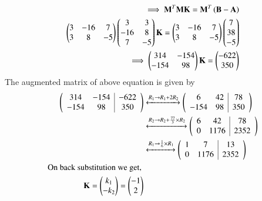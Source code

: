 \documentclass[journal]{IEEEtran}
\begin{document}
\begin{align}
\implies \mathbf{M}^T\mathbf{M}\mathbf{K}=\mathbf{M}^T\left(\mathbf{B}-\mathbf{A}\right)\\
    \begin{pmatrix}
        3 & -16 & 7\\
        3 & 8 & -5
    \end{pmatrix}\begin{pmatrix}
    3 & 3\\
    -16 & 8\\
    7 & -5
        \end{pmatrix}\mathbf{K}=\begin{pmatrix}
        3 & -16 & 7\\
        3 & 8 & -5
    \end{pmatrix}\begin{pmatrix}7\\38\\-5\end{pmatrix}\\
    \implies \begin{pmatrix}
        314 & -154\\
        -154 & 98
    \end{pmatrix}\mathbf{K}=\begin{pmatrix}-622\\350\end{pmatrix}
\end{align}
The augmented matrix of above equation is given by
\begin{align}
    \left(\begin{array}{cc|c}
        314 & -154 & -622 \\
        -154 & 98 & 350 
\end{array}\right) &\xleftrightarrow{R_1 \rightarrow R_1+ 2R_2} \left(\begin{array}{cc|c}
        6 & 42 & 78 \\
        -154 & 98 & 350 
\end{array}\right)\\ &\xleftrightarrow{R_2 \rightarrow R_2+ \frac{77}{3}\times R_2} \left(\begin{array}{cc|c}
        6 & 42 & 78 \\
        0 & 1176 & 2352 
\end{array}\right)\\
&\xleftrightarrow{R_1 \rightarrow \frac{1}{6}\times R_1} \left(\begin{array}{cc|c}
        1 & 7 & 13 \\
        0 & 1176 & 2352 
\end{array}\right)\\
\text{On back substitution we get, } \\
\mathbf{K}=\begin{pmatrix}k_1\\-k_2\end{pmatrix}=\begin{pmatrix}-1\\2\end{pmatrix}
\end{align}
\end{document}
